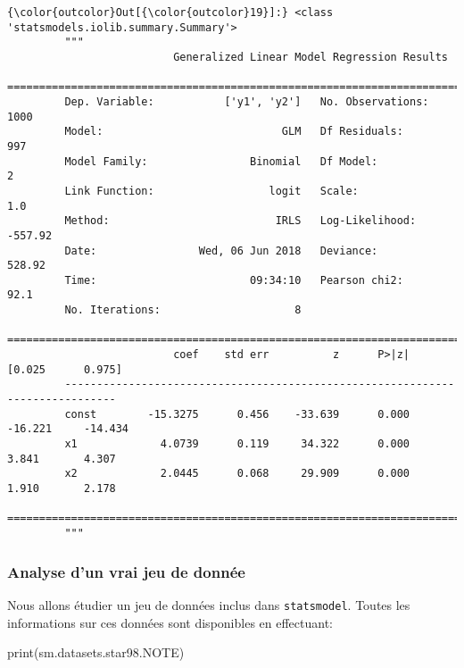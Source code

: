 \documentclass[11pt]{article}
\newenvironment{Shaded}{}{}
\newcommand{\NormalTok}[1]{{#1}}
\newcommand{\BuiltInTok}[1]{{#1}}
\begin{document}
\begin{Verbatim}[commandchars=\\\{\}]
{\color{outcolor}Out[{\color{outcolor}19}]:} <class 'statsmodels.iolib.summary.Summary'>
         """
                          Generalized Linear Model Regression Results                  
         ==============================================================================
         Dep. Variable:           ['y1', 'y2']   No. Observations:                 1000
         Model:                            GLM   Df Residuals:                      997
         Model Family:                Binomial   Df Model:                            2
         Link Function:                  logit   Scale:                             1.0
         Method:                          IRLS   Log-Likelihood:                -557.92
         Date:                Wed, 06 Jun 2018   Deviance:                       528.92
         Time:                        09:34:10   Pearson chi2:                     92.1
         No. Iterations:                     8                                         
         ==============================================================================
                          coef    std err          z      P>|z|      [0.025      0.975]
         ------------------------------------------------------------------------------
         const        -15.3275      0.456    -33.639      0.000     -16.221     -14.434
         x1             4.0739      0.119     34.322      0.000       3.841       4.307
         x2             2.0445      0.068     29.909      0.000       1.910       2.178
         ==============================================================================
         """
\end{Verbatim}
            
    \hypertarget{analyse-dun-vrai-jeu-de-donnuxe9e}{%
\subsubsection{Analyse d'un vrai jeu de
donnée}\label{analyse-dun-vrai-jeu-de-donnuxe9e}}

Nous allons étudier un jeu de données inclus dans \texttt{statsmodel}.
Toutes les informations sur ces données sont disponibles en effectuant:

\begin{Shaded}
\begin{Highlighting}[]
    \BuiltInTok{print}\NormalTok{(sm.datasets.star98.NOTE)}
\end{Highlighting}
\end{Shaded}
\end{document}
